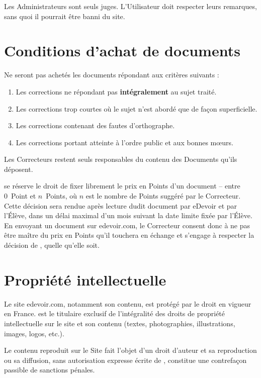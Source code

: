 Les Administrateurs sont seuls juges. L'Utilisateur doit respecter leurs remarques, sans quoi il pourrait être banni du site.


\section{Conditions d'achat de documents}

Ne seront pas achetés les documents répondant aux critères suivants :
\begin{enumerate}
   \item Les corrections ne répondant pas \textbf{intégralement} au sujet traité.
   \item Les corrections trop courtes où le sujet n'est abordé que de façon superficielle.
   \item Les corrections contenant des fautes d'orthographe.
   \item Les corrections portant atteinte à l'ordre public et aux bonnes m\oe{}urs.
\end{enumerate}

Les Correcteurs restent seuls responsables du contenu des Documents qu'ils déposent.

\eDevoir se réserve le droit de fixer librement le prix en Points d'un document -- entre 0~Point et $n$~Points, où $n$ est le nombre de Points suggéré par le Correcteur. Cette décision sera rendue après lecture dudit document par eDevoir et par l'\'Elève, dans un délai maximal d'un mois suivant la date limite fixée par l'\'Elève. En envoyant un document sur edevoir.com, le Correcteur consent donc à ne pas être maître du prix en Points qu'il touchera en échange et s'engage à respecter la décision de \eDevoir, quelle qu'elle soit.


\section{Propriété intellectuelle}

Le site edevoir.com, notamment son contenu, est protégé par le droit en vigueur en France. \eDevoir est le titulaire exclusif de l'intégralité des droits de propriété intellectuelle sur le site et son contenu (textes, photographies, illustrations, images, logos, etc.).

Le contenu reproduit sur le Site fait l’objet d’un droit d'auteur et sa reproduction ou sa diffusion, sans autorisation expresse écrite de \eDevoir, constitue une contrefaçon passible de sanctions pénales.


